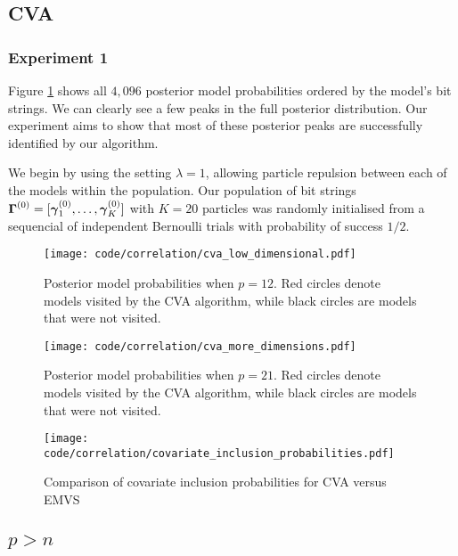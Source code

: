 \documentclass{amsart}[12pt]
\begin{document}
\subsection{CVA}

\subsubsection{Experiment 1}
Figure \ref{fig:posterior_model_probabilities} shows all $4,096$ posterior model probabilities ordered by the
model's bit strings. We can clearly see a few peaks in the full posterior distribution. Our experiment aims to
show that most of these posterior peaks are successfully identified by our algorithm.

We begin by using the setting $\lambda = 1$, allowing particle repulsion between each of the models within the
population. Our population of bit strings ${\boldsymbol \Gamma}^{(0)} = [{\boldsymbol \gamma}_1^{(0)}, \ldots, {\boldsymbol \gamma}_K^{(0)}]$ with
$K = 20$ particles was randomly initialised from a sequencial of independent Bernoulli trials with probability
of success $1/2$.

\begin{figure}
	\caption{Posterior model probabilities when $p = 12$. Red circles denote models visited by the CVA
						algorithm, while black circles are models that were not visited.}
	\label{fig:posterior_model_probabilities}
	\texttt{[image: code/correlation/cva\_low\_dimensional.pdf]}
\end{figure}

\begin{figure}
	\caption{Posterior model probabilities when $p = 21$. Red circles denote models visited by the CVA
						algorithm, while black circles are models that were not visited.}
	\label{fig:posterior_model_probabilities2}
	\texttt{[image: code/correlation/cva\_more\_dimensions.pdf]}
\end{figure}

\begin{figure}
	\caption{Comparison of covariate inclusion probabilities for CVA versus EMVS}
	\label{fig:covariate_inclusion_probabilities}
	\texttt{[image: code/correlation/covariate\_inclusion\_probabilities.pdf]}
\end{figure}

\subsection{$p > n$}
\end{document}
